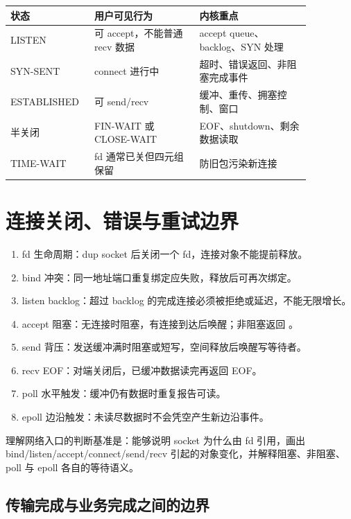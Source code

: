 \begin{longtable}{|p{0.2\linewidth}|p{0.32\linewidth}|p{0.34\linewidth}|}
\toprule
状态 & 用户可见行为 & 内核重点 \\
\midrule
LISTEN & 可 accept，不能普通 recv 数据 & accept queue、backlog、SYN 处理 \\\tablerowrule
SYN-SENT & connect 进行中 & 超时、错误返回、非阻塞完成事件 \\\tablerowrule
ESTABLISHED & 可 send/recv & 缓冲、重传、拥塞控制、窗口 \\\tablerowrule
半关闭 & FIN-WAIT 或 CLOSE-WAIT & EOF、shutdown、剩余数据读取 \\\tablerowrule
TIME-WAIT & fd 通常已关但四元组保留 & 防旧包污染新连接 \\
\bottomrule
\end{longtable}

\section{连接关闭、错误与重试边界}

\begin{enumerate}
\tightlist
\item fd 生命周期：dup socket 后关闭一个 fd，连接对象不能提前释放。
\item bind 冲突：同一地址端口重复绑定应失败，释放后可再次绑定。
\item listen backlog：超过 backlog 的完成连接必须被拒绝或延迟，不能无限增长。
\item accept 阻塞：无连接时阻塞，有连接到达后唤醒；非阻塞返回 。
\item send 背压：发送缓冲满时阻塞或短写，空间释放后唤醒写等待者。
\item recv EOF：对端关闭后，已缓冲数据读完再返回 EOF。
\item poll 水平触发：缓冲仍有数据时重复报告可读。
\item epoll 边沿触发：未读尽数据时不会凭空产生新边沿事件。
\end{enumerate}

\begin{rubricbox}
理解网络入口的判断基准是：能够说明 socket 为什么由 fd 引用，画出
bind/listen/accept/connect/send/recv 引起的对象变化，并解释阻塞、非阻塞、poll 与 epoll
各自的等待语义。
\end{rubricbox}

\subsection{传输完成与业务完成之间的边界}

